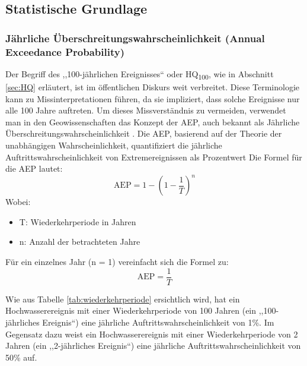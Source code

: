 \subsection{Statistische Grundlage}
\subsubsection{Jährliche Überschreitungswahrscheinlichkeit (Annual Exceedance Probability)}
Der Begriff des  ,,100-jährlichen Ereignisses`` oder HQ\textsubscript{100}, wie in Abschnitt \ref{sec:HQ} erläutert, ist im öffentlichen Diskurs weit verbreitet. Diese Terminologie kann zu Missinterpretationen führen, da sie impliziert, dass solche Ereignisse nur alle 100 Jahre auftreten. Um dieses Missverständnis zu vermeiden, verwendet man in den Geowissenschaften das Konzept der \ac{AEP}, auch bekannt als Jährliche Überschreitungswahrscheinlichkeit \parencite{uswrc1981} .
Die \ac{AEP}, basierend auf der Theorie der unabhängigen Wahrscheinlichkeit, quantifiziert die jährliche Auftrittswahrscheinlichkeit von Extremereignissen als Prozentwert
Die Formel für die AEP lautet:
\begin{equation*}
    \text{AEP} = 1 - \left(1 - \frac{1}{T}\right)^n
    \end{equation*}
Wobei:
\begin{itemize}
\item T: Wiederkehrperiode in Jahren
\item n: Anzahl der betrachteten Jahre
\end{itemize}
Für ein einzelnes Jahr (n = 1) vereinfacht sich die Formel zu:
\begin{equation}
\text{AEP} = \frac{1}{T}
\end{equation}

Wie aus Tabelle \ref{tab:wiederkehrperiode} ersichtlich wird, hat ein Hochwasserereignis mit einer Wiederkehrperiode von 100 Jahren (ein ,,100-jährliches Ereignis``) eine jährliche Auftrittswahrscheinlichkeit von 1\%. Im Gegensatz dazu weist ein Hochwasserereignis mit einer Wiederkehrperiode von 2 Jahren (ein ,,2-jährliches Ereignis``) eine jährliche Auftrittswahrscheinlichkeit von 50\% auf.

